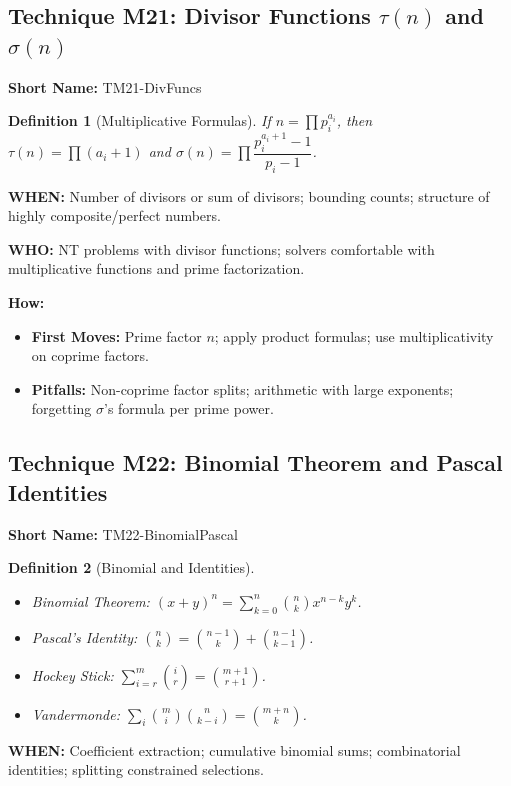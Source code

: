 \documentclass[12pt]{article}
\newtheorem{definition}{Definition}[section]
\begin{document}
\subsection{Technique M21: Divisor Functions \texorpdfstring{$\tau(n)$ and $\sigma(n)$}{tau(n) and sigma(n)}}
\textbf{Short Name:} TM21-DivFuncs

\begin{definition}[Multiplicative Formulas]
If $n=\prod p_i^{a_i}$, then $\tau(n)=\prod (a_i+1)$ and $\sigma(n)=\prod \dfrac{p_i^{a_i+1}-1}{p_i-1}$.
\end{definition}

\textbf{WHEN:} Number of divisors or sum of divisors; bounding counts; structure of highly composite/perfect numbers.

\textbf{WHO:} NT problems with divisor functions; solvers comfortable with multiplicative functions and prime factorization.

\textbf{How:}
\begin{itemize}
    \item \textbf{First Moves:} Prime factor $n$; apply product formulas; use multiplicativity on coprime factors.
    \item \textbf{Pitfalls:} Non-coprime factor splits; arithmetic with large exponents; forgetting $\sigma$'s formula per prime power.
\end{itemize}

\subsection{Technique M22: Binomial Theorem and Pascal Identities}
\textbf{Short Name:} TM22-BinomialPascal

\begin{definition}[Binomial and Identities]
\begin{itemize}
    \item Binomial Theorem: $(x+y)^n=\sum_{k=0}^n \binom{n}{k} x^{n-k}y^k$.
    \item Pascal's Identity: $\binom{n}{k}=\binom{n-1}{k}+\binom{n-1}{k-1}$.
    \item Hockey Stick: $\displaystyle \sum_{i=r}^{m} \binom{i}{r}=\binom{m+1}{r+1}$.
    \item Vandermonde: $\displaystyle \sum_{i} \binom{m}{i}\binom{n}{k-i}=\binom{m+n}{k}$.
\end{itemize}
\end{definition}

\textbf{WHEN:} Coefficient extraction; cumulative binomial sums; combinatorial identities; splitting constrained selections.
\end{document}

